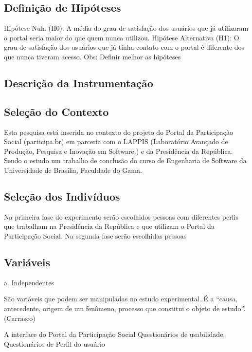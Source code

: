 \subsection{Definição de Hipóteses}

Hipótese Nula (H0): A média do grau de satisfação dos usuários que já utilizaram o portal seria maior do que quem nunca utilizou.
Hipótese Alternativa (H1): O grau de satisfação dos usuários que já tinha contato com o portal é diferente dos que nunca tiveram acesso.
Obs: Definir melhor as hipóteses

\subsection{Descrição da Instrumentação}

\subsection{Seleção do Contexto}

Esta pesquisa está inserida no contexto do projeto do Portal da Participação Social (participa.br) em parceria com o LAPPIS (Laboratório Avançado de Produção, Pesquisa e Inovação em Software.) e da Presidência da República. Sendo o estudo um trabalho de conclusão do curso de Engenharia de Software da Universidade de Brasília, Faculdade do Gama.

\subsection{Seleção dos Indivíduos}

	Na primeira fase do experimento serão escolhidos pessoas com diferentes perfis que trabalham na Presidência da República e que utilizam o Portal da Participação Social.
Na segunda fase serão escolhidas pessoas 

\subsection{Variáveis}
 
a. Independentes

São variáveis que podem ser manipuladas no estudo experimental. É a “causa, antecedente, origem de um fenômeno, processo que constitui o objeto de estudo”.(Carrasco)


A interface do Portal da Participação Social
Questionários de usabilidade.
Questionários de Perfil do usuário

